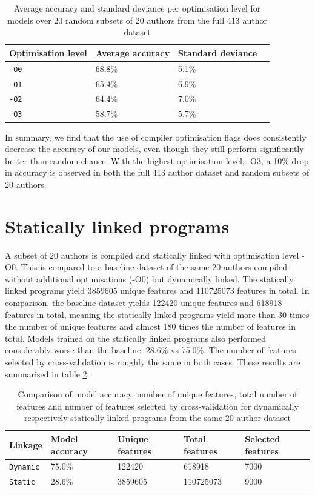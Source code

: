 \documentclass[a4paper,11pt]{kth-mag}
\begin{document}
\begin{table}[!htb]
    \centering
    \caption{Average accuracy and standard deviance per optimisation level for
    models over 20 random subsets of 20 authors from the full 413 author
    dataset}
        \begin{tabular}{ l l l l }
        Optimisation level & Average accuracy & Standard deviance \\
        \hline
        \lstinline{-O0} & 68.8\% & 5.1\% \\
        \lstinline{-O1} & 65.4\% & 6.9\% \\
        \lstinline{-O2} & 64.4\% & 7.0\% \\
        \lstinline{-O3} & 58.7\% & 5.7\% 
        \end{tabular}
       \label{tab:20-results}
\end{table}

In summary, we find that the use of compiler optimisation flags does
consistently decrease the accuracy of our models, even though they still
perform significantly better than random chance. With the highest optimisation
level, -O3, a 10\% drop in accuracy is observed in both the full 413 author
dataset and random subsets of 20 authors.

\section{Statically linked programs}
A subset of 20 authors is compiled and statically linked with optimisation
level -O0. This is compared to a baseline dataset of the same 20 authors
compiled without additional optimisations (-O0) but dynamically linked. The
statically linked programs yield 3859605 unique features and 110725073 features
in total. In comparison, the baseline dataset yields 122420 unique features and
618918 features in total, meaning the statically linked programs yield more
than 30 times the number of unique features and almost 180 times the number of
features in total. Models trained on the statically linked programs also
performed considerably worse than the baseline: 28.6\% vs 75.0\%. The number of
features selected by cross-validation is roughly the same in both cases. These
results are summarised in table \ref{tab:20-static-results}.

\begin{table}[!htb]
    \centering
    \caption{Comparison of model accuracy, number of unique features, total
    number of features and number of features selected by cross-validation for
    dynamically respectively statically linked programs from the same 20 author
    dataset} 
        \begin{tabular}{ l l l l l }
        Linkage & Model accuracy & Unique features & Total features &
        Selected features \\ \hline
        \lstinline{Dynamic} & 75.0\% & 122420 & 618918 & 7000 \\
        \lstinline{Static} & 28.6\% & 3859605 & 110725073 & 9000 \\
        \end{tabular}
    \label{tab:20-static-results}
\end{table}
\end{document}
